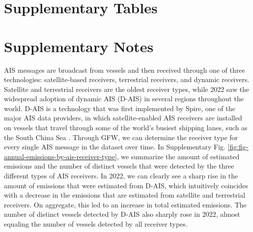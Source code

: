 \section*{Supplementary Tables}


\FloatBarrier


\FloatBarrier


\FloatBarrier


\FloatBarrier


\FloatBarrier


\FloatBarrier


\FloatBarrier


\section*{Supplementary Notes}


AIS messages are broadcast from vessels and then received through one of three technologies: satellite-based receivers, terrestrial receivers, and dynamic receivers. Satellite and terrestrial receivers are the oldest receiver types, while 2022 saw the widespread adoption of dynamic AIS (D-AIS) in several regions throughout the world. D-AIS is a technology that was first implemented by Spire, one of the major AIS data providers, in which satellite-enabled AIS receivers are installed on vessels that travel through some of the world's busiest shipping lanes, such as the South China Sea \cite{spire_documentation_2022}. Through GFW, we can determine the receiver type for every single AIS message in the dataset over time. In Supplementary Fig. \ref{fig:fig-annual-emissions-by-ais-receiver-type}, we summarize the amount of estimated emissions and the number of distinct vessels that were detected by the three different types of AIS receivers. In 2022, we can clearly see a sharp rise in the amount of emissions that were estimated from D-AIS, which intuitively coincides with a decrease in the emissions that are estimated from satellite and terrestrial receivers. On aggregate, this led to an increase in total estimated emissions. The number of distinct vessels detected by D-AIS also sharply rose in 2022, almost equaling the number of vessels detected by all receiver types.

